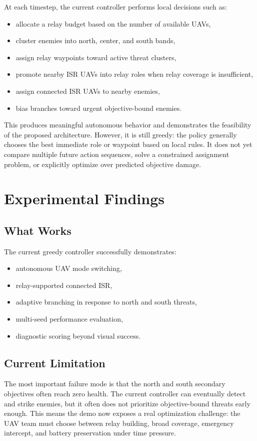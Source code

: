 \documentclass[conference]{IEEEtran}
\begin{document}
At each timestep, the current controller performs local decisions such as:
\begin{itemize}
    \item allocate a relay budget based on the number of available UAVs,
    \item cluster enemies into north, center, and south bands,
    \item assign relay waypoints toward active threat clusters,
    \item promote nearby ISR UAVs into relay roles when relay coverage is insufficient,
    \item assign connected ISR UAVs to nearby enemies,
    \item bias branches toward urgent objective-bound enemies.
\end{itemize}

This produces meaningful autonomous behavior and demonstrates the feasibility
of the proposed architecture. However, it is still greedy: the policy generally
chooses the best immediate role or waypoint based on local rules. It does not
yet compare multiple future action sequences, solve a constrained assignment
problem, or explicitly optimize over predicted objective damage.

\section{Experimental Findings}

\subsection{What Works}
The current greedy controller successfully demonstrates:
\begin{itemize}
    \item autonomous UAV mode switching,
    \item relay-supported connected ISR,
    \item adaptive branching in response to north and south threats,
    \item multi-seed performance evaluation,
    \item diagnostic scoring beyond visual success.
\end{itemize}

\subsection{Current Limitation}
The most important failure mode is that the north and south secondary objectives
often reach zero health. The current controller can eventually detect and strike
enemies, but it often does not prioritize objective-bound threats early enough.
This means the demo now exposes a real optimization challenge: the UAV team must
choose between relay building, broad coverage, emergency intercept, and battery
preservation under time pressure.
\end{document}
